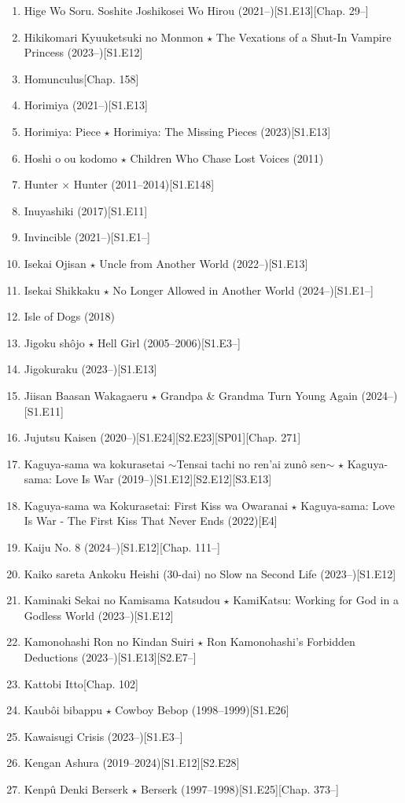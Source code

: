 \documentclass{article}
\begin{document}
\begin{enumerate}
    \item {\sc Hige Wo Soru. Soshite Joshikosei Wo Hirou} (2021--)\hfill[S1.E13][Chap. 29--]
    \item {\sc Hikikomari Kyuuketsuki no Monmon $\star$ The Vexations of a Shut-In Vampire Princess} (2023--)\hfill[S1.E12]
    \item {\sc Homunculus}\hfill[Chap. 158]
    \item {\sc Horimiya} (2021--)\hfill[S1.E13]
    \item {\sc Horimiya: Piece $\star$ Horimiya: The Missing Pieces} (2023)\hfill[S1.E13]
    \item {\sc Hoshi o ou kodomo $\star$ Children Who Chase Lost Voices} (2011)
    \item {\sc Hunter $\times$ Hunter} (2011--2014)\hfill[S1.E148]
    \item {\sc Inuyashiki} (2017)\hfill[S1.E11]
    \item Invincible (2021--)\hfill[S1.E1--]
    \item Isekai Ojisan $\star$ Uncle from Another World (2022--)\hfill[S1.E13]
    \item Isekai Shikkaku $\star$ No Longer Allowed in Another World (2024--)\hfill[S1.E1--]
    \item {\sc Isle of Dogs} (2018)
    \item Jigoku shôjo $\star$ Hell Girl (2005--2006)\hfill[S1.E3--]
    \item Jigokuraku (2023--)\hfill[S1.E13]
    \item {\sc Jiisan Baasan Wakagaeru $\star$ Grandpa \& Grandma Turn Young Again} (2024--)\hfill[S1.E11]
    \item {\sc Jujutsu Kaisen} (2020--)\hfill[S1.E24][S2.E23][SP01][Chap. 271]
    \item Kaguya-sama wa kokurasetai $\sim$Tensai tachi no ren'ai zun\^o sen$\sim$ $\star$ Kaguya-sama: Love Is War (2019--)\hfill[S1.E12][S2.E12][S3.E13]
    \item {\sc Kaguya-sama wa Kokurasetai: First Kiss wa Owaranai $\star$ Kaguya-sama: Love Is War - The First Kiss That Never Ends} (2022)\hfill[E4]
    \item Kaiju No. 8 (2024--)\hfill[S1.E12][Chap. 111--]
    \item Kaiko sareta Ankoku Heishi (30-dai) no Slow na Second Life (2023--)\hfill[S1.E12]
    \item {\sc Kaminaki Sekai no Kamisama Katsudou $\star$ KamiKatsu: Working for God in a Godless World} (2023--)\hfill[S1.E12]
    \item {\sc Kamonohashi Ron no Kindan Suiri $\star$ Ron Kamonohashi's Forbidden Deductions} (2023--)\hfill[S1.E13][S2.E7--]
    \item {\sc Kattobi Itto}\hfill[Chap. 102]
    \item {\sc Kaub\^oi bibappu $\star$ Cowboy Bebop} (1998--1999)\hfill[S1.E26]
    \item Kawaisugi Crisis (2023--)\hfill[S1.E3--]
    \item {\sc Kengan Ashura} (2019--2024)\hfill[S1.E12][S2.E28]
    \item {\sc Kenp\^u Denki Berserk $\star$ Berserk} (1997--1998)\hfill[S1.E25][Chap. 373--]
    

\end{enumerate}
\end{document}
